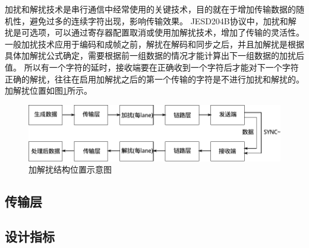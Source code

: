 \documentclass[UTF8]{ctexart}
\begin{document}
加扰和解扰技术是串行通信中经常使用的关键技术，目的就在于增加传输数据的随机性，避免过多的连续字符出现，影响传输效果。
JESD204B协议中，加扰和解扰是可选项，可以通过寄存器配置取消或使用加解扰技术，增加了传输的灵活性。
一般加扰技术应用于编码和成帧之前，解扰在解码和同步之后，并且加解扰是根据具体加解扰公式确定，需要根据前一组数据的情况才能计算出下一组数据的加扰后值。
所以有一个字符的延时，接收端要在正确收到一个字符后才能对下一个字符正确的解扰，往往在启用加解扰之后的第一个传输的字符是不进行加扰和解扰的。
加解扰位置如图\ref{fig:functional_location_of_scrambler_and_descrambler}所示。

\begin{figure}[H]
\centering
\includegraphics[width=15cm]{./img/functional_location_of_scrambler_and_descrambler.pdf}
\caption{加解扰结构位置示意图}
\label{fig:functional_location_of_scrambler_and_descrambler}
\end{figure}

\subsection{传输层}

\subsection{设计指标}



\end{document}

